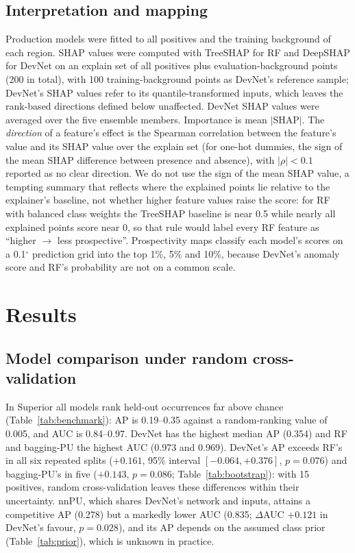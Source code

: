 \documentclass[pdflatex,sn-apa]{sn-jnl}
\begin{document}
\subsection{Interpretation and mapping}\label{sec:shap}

Production models were fitted to all positives and the training background of each region. SHAP values \citep{Lundberg2017} were computed with TreeSHAP for RF \citep{Lundberg2020} and DeepSHAP for DevNet on an explain set of all positives plus evaluation-background points (200 in total), with 100 training-background points as DevNet's reference sample; DevNet's SHAP values refer to its quantile-transformed inputs, which leaves the rank-based directions defined below unaffected. DevNet SHAP values were averaged over the five ensemble members. Importance is mean $|$SHAP$|$. The \emph{direction} of a feature's effect is the Spearman correlation between the feature's value and its SHAP value over the explain set (for one-hot dummies, the sign of the mean SHAP difference between presence and absence), with $|\rho| < 0.1$ reported as no clear direction. We do not use the sign of the mean SHAP value, a tempting summary that reflects where the explained points lie relative to the explainer's baseline, not whether higher feature values raise the score: for RF with balanced class weights the TreeSHAP baseline is near 0.5 while nearly all explained points score near 0, so that rule would label every RF feature as ``higher $\rightarrow$ less prospective''. Prospectivity maps classify each model's scores on a 0.1$^\circ$ prediction grid into the top 1\%, 5\% and 10\%, because DevNet's anomaly score and RF's probability are not on a common scale.

\section{Results}\label{sec:results}

\subsection{Model comparison under random cross-validation}\label{sec:res-random}

In Superior all models rank held-out occurrences far above chance (Table~\ref{tab:benchmark}): AP is 0.19--0.35 against a random-ranking value of 0.005, and AUC is 0.84--0.97. DevNet has the highest median AP (0.354) and RF and bagging-PU the highest AUC (0.973 and 0.969). DevNet's AP exceeds RF's in all six repeated splits ($+0.161$, 95\% interval $[-0.064, +0.376]$, $p = 0.076$) and bagging-PU's in five ($+0.143$, $p = 0.086$; Table~\ref{tab:bootstrap}): with 15 positives, random cross-validation leaves these differences within their uncertainty. nnPU, which shares DevNet's network and inputs, attains a competitive AP (0.278) but a markedly lower AUC (0.835; $\Delta$AUC $+0.121$ in DevNet's favour, $p = 0.028$), and its AP depends on the assumed class prior (Table~\ref{tab:prior}), which is unknown in practice.
\end{document}
